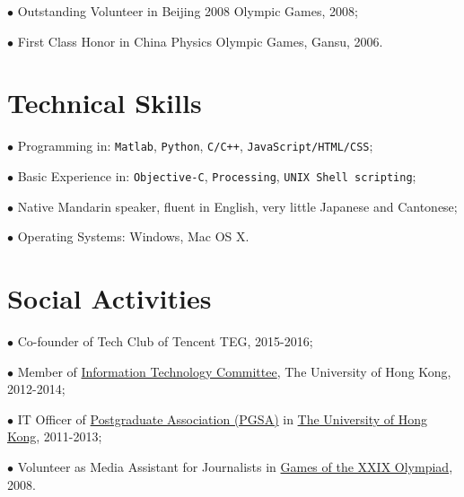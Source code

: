 \documentclass[10pt]{article}
\renewcommand{\section}[2]%
        {\pagebreak[2]\vspace{1.3\baselineskip}%
         \phantomsection\addcontentsline{toc}{section}{#1}%
         \hspace{0in}%
         \marginpar{
         \raggedright \scshape #1}#2}
\begin{document}
$\bullet$ Outstanding Volunteer in Beijing 2008 Olympic Games, 2008;

$\bullet$ First Class Honor in China Physics Olympic Games, Gansu, 2006.


\section{Technical Skills}
$\bullet$ Programming in: \texttt{Matlab}, \texttt{Python}, \texttt{C/C++}, \texttt{JavaScript/HTML/CSS};

$\bullet$ Basic Experience in: \texttt{Objective-C}, \texttt{Processing}, \texttt{UNIX Shell scripting};

$\bullet$ Native Mandarin speaker, fluent in English, very little Japanese and Cantonese;

$\bullet$ Operating Systems: Windows, Mac OS X.


\section{Social Activities}
$\bullet$ Co-founder of Tech Club of Tencent TEG, 2015-2016;

$\bullet$ Member of \href{http://intraweb.hku.hk/local/its/itc.html}{Information Technology Committee}, The University of Hong Kong, 2012-2014;

$\bullet$ IT Officer of \href{http://www.pgsa.hku.hk/}{Postgraduate Association (PGSA)} in
 \href{http://www.hku.hk/}{The University of Hong Kong}, 2011-2013;

$\bullet$ Volunteer as Media Assistant for Journalists in \href{http://en.wikipedia.org/wiki/2008_Summer_Olympics}{Games of the XXIX Olympiad}, 2008.
\end{document}
